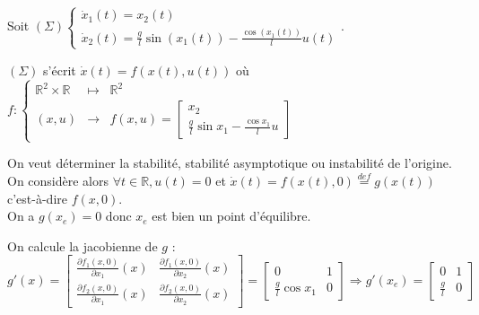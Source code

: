 \documentclass[a4paper]{article}
\begin{document}
                        Soit $(\Sigma) 
                        \begin{cases} 
                                \dot x_1(t) = x_2(t) \\
                                \dot x_2(t) = \frac{g}{l} \sin (x_1(t)) - \frac{\cos (x_1(t))}{l} u(t)
                        \end{cases}$.

                        \vspace{10pt}

                        $(\Sigma)$ s'écrit $\dot x(t) = f(x(t), u(t))$ où $f : \left\{
                        \begin{array}{rcl}
                            \mathbb{R}^2 \times \mathbb{R} & \mapsto & \mathbb{R}^2 \\
                            (x,u) & \to & f(x,u) = \begin{bmatrix} x_2 \\ \frac{g}{l} \sin x_1 - \frac{\cos x_1}{l} u \end{bmatrix}
                        \end{array} \right.$

                        \vspace{10pt}

                        On veut déterminer la stabilité, stabilité asymptotique ou instabilité de l'origine.
                        On considère alors $\forall t \in \mathbb{R}, u(t) = 0$ et $\dot x(t) = f(x(t), 0) \overset{def}{=} g(x(t))$ c'est-à-dire $f(x,0)$. \\
                        On a $g(x_e)=0$ donc $x_e$ est bien un point d'équilibre.

                        On calcule la jacobienne de $g$ :
                        $$
                        g'(x) = 
                        \begin{bmatrix}
                                \frac{\partial f_1(x,0)}{\partial x_1}(x) & \frac{\partial f_1(x,0)}{\partial x_2}(x) \\
                                \frac{\partial f_2(x,0)}{\partial x_1}(x) & \frac{\partial f_2(x,0)}{\partial x_2}(x)
                        \end{bmatrix}
                        =
                        \begin{bmatrix}
                                0 & 1 \\
                                \frac{g}{l} \cos x_1 & 0
                        \end{bmatrix}
                        \Longrightarrow
                        g'(x_e) = 
                        \begin{bmatrix}
                                0 & 1 \\
                                \frac{g}{l} & 0
                        \end{bmatrix}
                        $$
\end{document}

